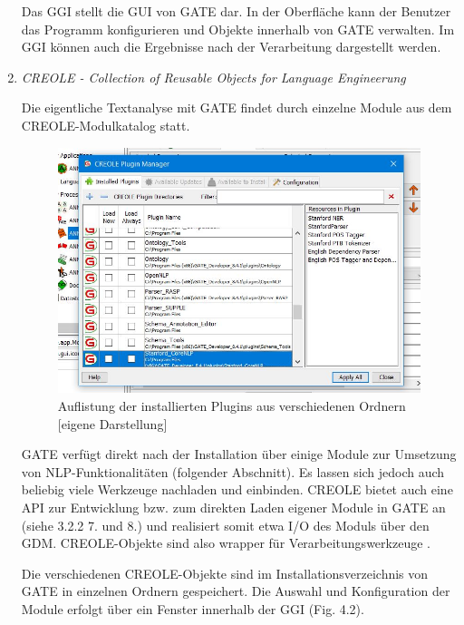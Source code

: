\documentclass[12pt]{report}
\begin{document}
\begin{enumerate}
Das GGI stellt die GUI von GATE dar. In der Oberfläche kann der Benutzer das Programm konfigurieren und Objekte innerhalb von GATE verwalten. Im GGI können auch die Ergebnisse nach der Verarbeitung dargestellt werden.

\item \textit{CREOLE - Collection of Reusable Objects for Language Engineerung}

Die eigentliche Textanalyse mit GATE findet durch einzelne Module aus dem CREOLE-Modulkatalog statt.

\begin{figure}[h!]
\begin{center}
\includegraphics[scale=0.8]{GATE_Bilder/CREOLE.jpg}
\caption{Auflistung der installierten Plugins aus verschiedenen Ordnern [eigene Darstellung]}
\end{center}
\end{figure} 

GATE verfügt direkt nach der Installation über einige Module zur Umsetzung von NLP-Funktionalitäten (folgender Abschnitt). Es lassen sich jedoch auch beliebig viele Werkzeuge nachladen und einbinden. CREOLE bietet auch eine API zur Entwicklung bzw. zum direkten Laden eigener Module in GATE an (siehe 3.2.2 7. und 8.) und realisiert somit etwa I/O des Moduls über den GDM. CREOLE-Objekte sind also wrapper für Verarbeitungswerkzeuge \cite{cu02}. 

Die verschiedenen CREOLE-Objekte sind im Installationsverzeichnis von GATE in einzelnen Ordnern gespeichert. Die Auswahl und Konfiguration der Module erfolgt über ein Fenster innerhalb der GGI (Fig. 4.2).
\end{enumerate}
\end{document}
